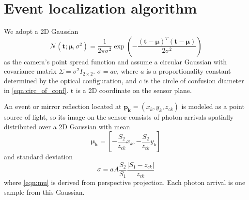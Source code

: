 \section{Event localization algorithm}

We adopt a 2D Gaussian 
\begin{equation}
\mathcal{N}(\bm{t};\bm{\mu},\sigma^2)=\frac{1}{2\pi\sigma^2}\exp\left({-\frac{(\bm{t}-\bm{\mu})^T(\bm{t}-\bm{\mu})}{2\sigma^2}}\right) 
\end{equation}
as the camera's point spread function and assume a circular Gaussian with 
covariance matrix $\Sigma=\sigma^2 I_{2\times2}$. 
$\sigma=ac$, where $a$ is a proportionality constant determined by the 
optical configuration, and $c$ is the circle of confusion diameter in \cref{eqn:circ_of_conf}.
$\bm{t}$ is a 2D coordinate on the sensor plane.

An event or mirror reflection located at $\bm{p_k}=(x_k,y_k,z_{ck})$ is modeled as 
a point source of light, so its image on the sensor consists of photon arrivals 
spatially distributed over a 2D Gaussian with mean 
\begin{equation} \label{eqn:mu}
\bm{\mu_k}=\left[ -\frac{S_2}{z_{ck}}x_k, -\frac{S_2}{z_{ck}}y_k \right]
\end{equation}
and standard deviation 
\begin{equation} \label{eqn:stdev}
\sigma=aA\frac{S_2}{S_1}\frac{|S_1-z_{ck}|}{z_{ck}}
\end{equation}
where \cref{eqn:mu} is derived from perspective projection.
Each photon arrival is one sample from this Gaussian.

